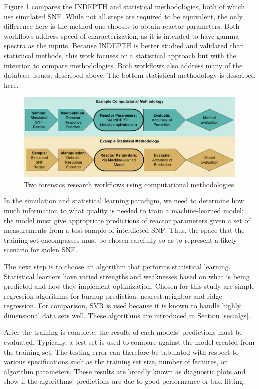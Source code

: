 Figure \ref{fig:compworkflow} compares the \gls{INDEPTH} and statistical
methodologies, both of which use simulated \gls{SNF}.  While not all steps are
required to be equivalent, the only difference here is the method one chooses
to obtain reactor parameters. Both workflows address speed of characterization,
as it is intended to have gamma spectra as the inputs.  Because \gls{INDEPTH}
is better studied and validated than statistical methods,  this work
focuses on a statistical approach but with the intention to compare
methodologies.  Both workflows also address many of the database issues,
described above. The bottom statistical methodology is described here.
\\
\begin{figure}[!tbh]
  \includegraphics[width=\linewidth]{./chapters/intro/CompStatForensicsWorkflow.png}
  \caption{Two forensics research workflows using computational methodologies}
  \label{fig:compworkflow}
\end{figure}

In the simulation and statistical learning paradigm, we need to determine how
much information to what quality is needed to train a machine-learned model;
the model must give appropriate predictions of reactor parameters given a set
of measurements from a test sample of interdicted \gls{SNF}. Thus, the space 
that the training set encompasses must be chosen carefully so as to represent 
a likely scenario for stolen \gls{SNF}.

The next step is to choose an algorithm that performs statistical learning.
Statistical learners have varied strengths and weaknesses based on what is
being predicted and how they implement optimization.  Chosen for this study are
simple regression algorithms for burnup prediction: nearest neighbor and ridge
regression.  For comparison, \gls{SVR} is used because it is known to handle
highly dimensional data sets well.  These algorithms are introduced in Section
\ref{sec:algs}.

After the training is complete, the results of each models' predictions must be
evaluated.  Typically, a test set is used to compare against the model created
from the training set.  The testing error can therefore be tabulated with
respect to various specifications such as the training set size, number of
features, or algorithm parameters. These results are broadly known as
diagnostic plots and show if the algorithms' predictions are due to good
performance or bad fitting. 

